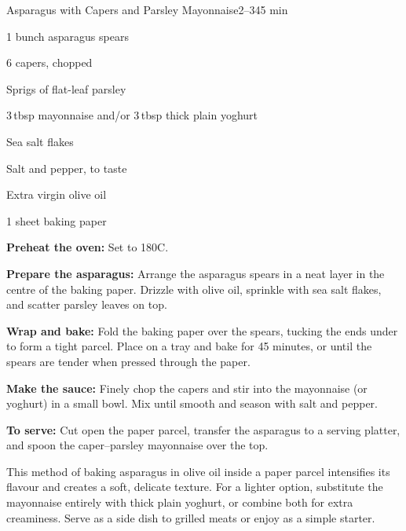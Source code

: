 \begin{recipebox}{Asparagus with Capers and Parsley Mayonnaise}{2--3}{45 min}
  \begin{ingredients}
    \item 1 bunch asparagus spears
    \item 6 capers, chopped
    \item Sprigs of flat-leaf parsley
    \item 3\,tbsp mayonnaise and/or 3\,tbsp thick plain yoghurt
    \item Sea salt flakes
    \item Salt and pepper, to taste
    \item Extra virgin olive oil
    \item 1 sheet baking paper
  \end{ingredients}

  \begin{method}
    \item \textbf{Preheat the oven:} Set to 180\degree C.
    \item \textbf{Prepare the asparagus:} Arrange the asparagus spears in a neat layer in the centre of the baking paper. Drizzle with olive oil, sprinkle with sea salt flakes, and scatter parsley leaves on top.
    \item \textbf{Wrap and bake:} Fold the baking paper over the spears, tucking the ends under to form a tight parcel. Place on a tray and bake for 45 minutes, or until the spears are tender when pressed through the paper.
    \item \textbf{Make the sauce:} Finely chop the capers and stir into the mayonnaise (or yoghurt) in a small bowl. Mix until smooth and season with salt and pepper.
    \item \textbf{To serve:} Cut open the paper parcel, transfer the asparagus to a serving platter, and spoon the caper–parsley mayonnaise over the top.
  \end{method}

  \begin{notes}
    This method of baking asparagus in olive oil inside a paper parcel intensifies its flavour and creates a soft, delicate texture.  
    For a lighter option, substitute the mayonnaise entirely with thick plain yoghurt, or combine both for extra creaminess.  
    Serve as a side dish to grilled meats or enjoy as a simple starter.
  \end{notes}
\end{recipebox}
